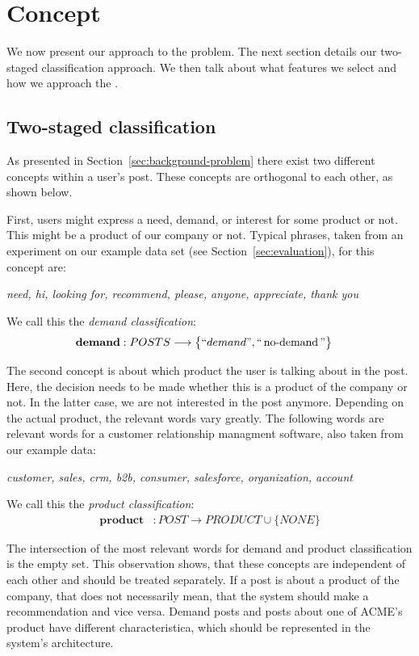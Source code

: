\section{Concept}
\label{sec:concept}

We now present our approach to the \nto problem.
The next section details our two-staged classification approach.
We then talk about what features we select and how we approach the .

\subsection{Two-staged classification}
As presented in Section~\ref{sec:background-problem} there exist two different concepts within a user's post.
These concepts are orthogonal to each other, as shown below.

First, users might express a need, demand, or interest for some product or not.
This might be a product of our company or not.
Typical phrases, taken from an experiment on our example data set (see Section~\ref{sec:evaluation}), for this concept are:
\begin{center}
	\textit{need, hi, looking for, recommend, please, anyone, appreciate, thank you}
\end{center}
We call this the \emph{demand classification}:
\begin{align}
	\mathbf{demand}&: POSTS \longrightarrow \big\{ ``demand", ``\operatorname{no-demand}" \big\}
\end{align}

The second concept is about which product the user is talking about in the post.
Here, the decision needs to be made whether this is a product of the company or not.
In the latter case, we are not interested in the post anymore.
Depending on the actual product, the relevant words vary greatly.
The following words are relevant words for a customer relationship managment software, also taken from our example data:
\begin{center}
	\textit{customer, sales, crm, b2b, consumer, salesforce, organization, account}
\end{center}

We call this the \emph{product classification}:
\begin{align}
	\mathbf{product}&: POST \longrightarrow  PRODUCT \cup \big\{ NONE \big\}
\end{align}

The intersection of the most relevant words for demand and product classification is the empty set.
This observation shows, that these concepts are independent of each other and should be treated separately.
If a post is about a product of the company, that does not necessarily mean, that the system should make a recommendation and vice versa.
Demand posts and posts about one of ACME's product have different characteristica, which should be represented in the system's architecture.

